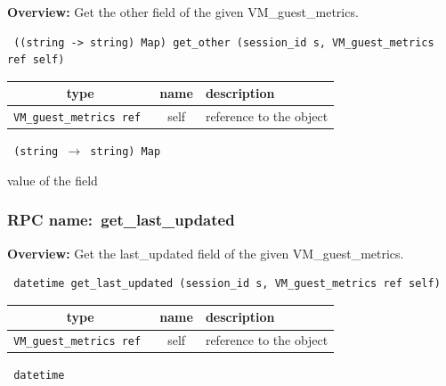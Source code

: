 {\bf Overview:} 
Get the other field of the given VM\_guest\_metrics.

\begin{verbatim} ((string -> string) Map) get_other (session_id s, VM_guest_metrics ref self)\end{verbatim}



 
\vspace{0.3cm}
\begin{tabular}{|c|c|p{7cm}|}
 \hline
{\bf type} & {\bf name} & {\bf description} \\ \hline
{\tt VM\_guest\_metrics ref } & self & reference to the object \\ \hline 

\end{tabular}

\vspace{0.3cm}

{\tt 
(string $\rightarrow$ string) Map
}


value of the field
\vspace{0.3cm}
\vspace{0.3cm}
\vspace{0.3cm}
\subsubsection{RPC name:~get\_last\_updated}

{\bf Overview:} 
Get the last\_updated field of the given VM\_guest\_metrics.

\begin{verbatim} datetime get_last_updated (session_id s, VM_guest_metrics ref self)\end{verbatim}



 
\vspace{0.3cm}
\begin{tabular}{|c|c|p{7cm}|}
 \hline
{\bf type} & {\bf name} & {\bf description} \\ \hline
{\tt VM\_guest\_metrics ref } & self & reference to the object \\ \hline 

\end{tabular}

\vspace{0.3cm}

{\tt 
datetime
}



